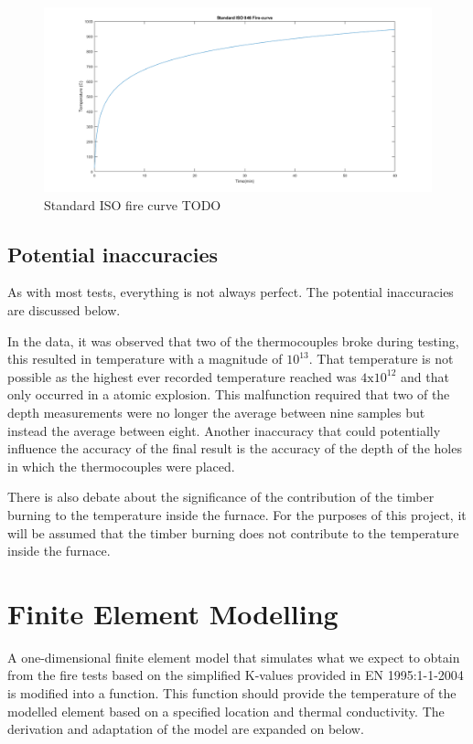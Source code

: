 	\begin{figure}[H]
	\centering 
	\includegraphics[width=\linewidth]{figures/firecurve.png}
	\caption{Standard ISO fire curve TODO}
	\label{firecurve_fig}
	\end{figure}
	
	\subsection{Potential inaccuracies}
	As with most tests, everything is not always perfect. 
	The potential inaccuracies are discussed below. 
	
	In the data, it was observed that two of the thermocouples broke during testing, this resulted in temperature with a magnitude of $10^{13}$. 
	That temperature is not possible as the highest ever recorded temperature reached was $4\text{x}10^{12}$ and that only occurred in a atomic explosion. %
	This malfunction required that two of the depth measurements were no longer the average between nine samples but instead the average between eight.
	Another inaccuracy that could potentially influence the accuracy of the final result is the accuracy of the depth of the holes in which the thermocouples were placed. 
	
	There is also debate about the significance of the contribution of the timber burning to the temperature inside the furnace. 
	For the purposes of this project, it will be assumed that the timber burning does not contribute to the temperature inside the furnace.
	
\section{Finite Element Modelling}
A one-dimensional finite element model that simulates what we expect to obtain from the fire tests based on the simplified K-values provided in EN 1995:1-1-2004 is modified into a function.
This function should provide the temperature of the modelled element based on a specified location and thermal conductivity.
The derivation and adaptation of the model are expanded on below.
